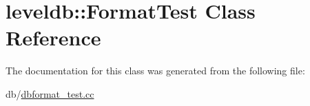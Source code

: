 \hypertarget{classleveldb_1_1_format_test}{\section{leveldb\-:\-:Format\-Test Class Reference}
\label{classleveldb_1_1_format_test}
}


The documentation for this class was generated from the following file\-:\begin{DoxyCompactItemize}
\item 
db/\hyperlink{dbformat__test_8cc}{dbformat\-\_\-test.\-cc}\end{DoxyCompactItemize}
